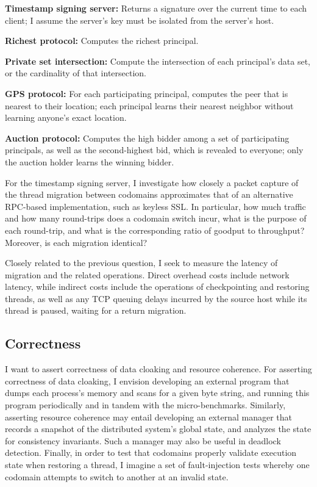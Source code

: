\begin{widelist}
\item \textbf{Timestamp signing server:} Returns a signature over the current
time to each client; I assume the server's key must be isolated from the
server's host.
%
\item \textbf{Richest protocol:} Computes the richest principal.
%
\item \textbf{Private set intersection:} Compute the intersection of each
    principal's data set, or the cardinality of that intersection.
\item \textbf{GPS protocol:} For each participating principal,
computes the peer that is nearest to their location; each principal learns
their nearest neighbor without learning anyone's exact location.
%
\item \textbf{Auction protocol:} Computes the high bidder among a set of
participating principals, as well as the second-highest bid, which is revealed
to everyone; only the auction holder learns the winning bidder.
\end{widelist}

For the timestamp signing server, I investigate how closely a
packet capture of the thread migration between codomains approximates
that of an alternative RPC-based implementation, such as keyless SSL\@.
%
In particular, how much traffic and how many round-trips does a codomain switch
incur, what is the purpose of each round-trip, and what is the corresponding
ratio of goodput to throughput?
%
Moreover, is each migration identical?


Closely related to the previous question, I seek to measure the latency of
migration and the related operations.
%
Direct overhead costs include network latency, while indirect costs include the
operations of checkpointing and restoring threads, as well as any TCP queuing
delays incurred by the source host while its thread is paused, waiting for
a return migration.


\subsection{Correctness}

I want to assert correctness of data cloaking and resource coherence.
%
For asserting correctness of data cloaking, I envision developing an external
program that dumps each process's memory and scans for a given byte string,
and running this program periodically and in tandem with the micro-benchmarks.
%
Similarly, asserting resource coherence may entail developing an external
manager that records a snapshot of the distributed system's global state, and
analyzes the state for consistency invariants.
%
Such a manager may also be useful in deadlock detection.
%
Finally, in order to test that codomains properly validate execution state when
restoring a thread, I imagine a set of fault-injection tests whereby one
codomain attempts to switch to another at an invalid state.
